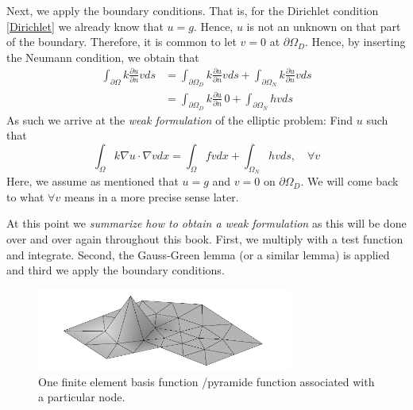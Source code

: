 Next,   
we apply the boundary conditions. That is, for the Dirichlet
condition \eqref{Dirichlet} we already know that $u=g$. Hence, $u$ is not an unknown on that part of the boundary.  Therefore, it is common 
to let $v=0$ at $\partial \Omega_D$. Hence, by inserting the Neumann condition, we obtain that  
\begin{align}
	\int_{\partial \Omega} k\frac{\partial u} {\partial n} v ds &=   
\int_{\partial \Omega_D} k\frac{\partial u} {\partial n} v ds +   \int_{\partial \Omega_N} k\frac{\partial u} {\partial n} v ds  \\   
	&= \int_{\partial \Omega_D} k\frac{\partial u} {\partial n} \, 0 +   \int_{\partial \Omega_N} h v ds   
\end{align}
As such we arrive at the \emph{weak formulation} of the elliptic problem: 
Find $u$ such that 
\begin{equation}
\label{weakform}
\int_\Omega k \nabla u \cdot \nabla v dx = \int_\Omega f v dx + \int_{\Omega_N} h v ds, \quad \forall v  
\end{equation}
Here, we assume as mentioned that $u=g$ and $v=0$ on $\partial \Omega_D$. We will come back to what $\forall v$ means in a 
more precise sense later.  

At this point we \emph{summarize how to obtain a weak formulation} as this will be done over and over again throughout this book.  
First, we multiply with a test function and integrate. Second, the Gauss-Green lemma (or a similar lemma) is applied and third
we apply the boundary conditions. 

\begin{figure}
\begin{center}
\includegraphics[width=0.75\textwidth]{chapters/elliptic/pics/fem.png}
\caption{One finite element basis function /pyramide function associated with a particular node.}
\label{fig:fembasis}
\end{center}
\end{figure}


